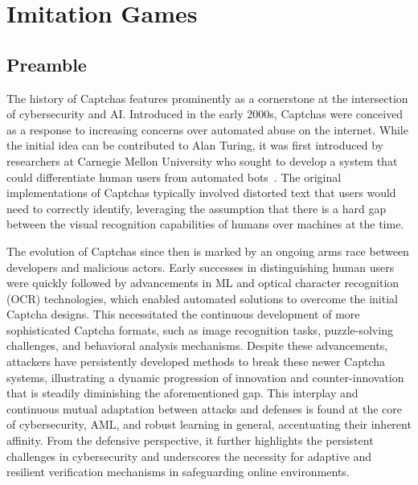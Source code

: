 \chapter{Imitation Games}\label{ch:recaptcha}

\section*{Preamble}

The history of Captchas features prominently as a cornerstone at the intersection of cybersecurity and \gls{AI}.
Introduced in the early 2000s, Captchas were conceived as a response to increasing concerns over automated abuse on the internet.
While the initial idea can be contributed to Alan Turing, it was first introduced by researchers at Carnegie Mellon University who sought to develop a system that could differentiate human users from automated bots~\cite{von2003captcha}.
The original implementations of Captchas typically involved distorted text that users would need to correctly identify, leveraging the assumption that there is a hard gap between  the visual recognition capabilities of humans over machines at the time.

The evolution of Captchas since then is marked by an ongoing arms race between developers and malicious actors.
Early successes in distinguishing human users were quickly followed by advancements in \gls{ML} and optical character recognition (OCR) technologies, which enabled automated solutions to overcome the initial Captcha designs.
This necessitated the continuous development of more sophisticated Captcha formats, such as image recognition tasks, puzzle-solving challenges, and behavioral analysis mechanisms.
Despite these advancements, attackers have persistently developed methods to break these newer Captcha systems, illustrating a dynamic progression of innovation and counter-innovation that is steadily diminishing the aforementioned gap.
This interplay and continuous mutual adaptation between attacks and defenses is found at the core of cybersecurity, \gls{AML}, and robust learning in general, accentuating their inherent affinity.
From the defensive perspective, it further highlights the persistent challenges in cybersecurity and underscores the necessity for adaptive and resilient verification mechanisms in safeguarding online environments.

